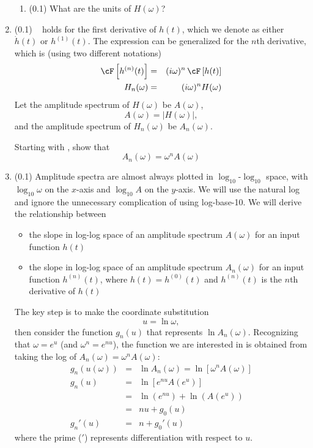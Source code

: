 \documentclass[11pt,titlepage,fleqn]{article}
\newcommand{\fft}{h}
\newcommand{\ffw}{H}
\begin{document}
\begin{enumerate}
\begin{enumerate}
\item (0.1) What are the units of $\ffw(\omega)$?
\end{enumerate}


\item (0.1) \ptag\  holds for the first derivative of $\fft(t)$, which we denote as either $\dot{\fft}(t)$ or $\fft^{(1)}(t)$. The expression can be generalized for the $n$th derivative, which is (using two different notations)
%
\begin{eqnarray}
\cF \left[ \fft^{(n)}(t) \right] &=& (i\omega)^n \, \cF \left[ \fft(t) \right]
\\
\ffw_n(\omega) &=& (i\omega)^n \ffw(\omega)
\label{fftnder}
\end{eqnarray}
%
Let the amplitude spectrum of $\ffw(\omega)$ be $A(\omega)$,
%
\begin{equation}
A(\omega) = |\ffw(\omega)|,
\end{equation}
%
and the amplitude spectrum of $\ffw_n(\omega)$ be $A_n(\omega)$.

Starting with , show that
%
\begin{equation}
A_n(\omega) = \omega^n A(\omega)
\end{equation}


\item (0.1) \ptag Amplitude spectra are almost always plotted in $\log_{10}$-$\log_{10}$ space, with $\log_{10}\omega$ on the $x$-axis and $\log_{10}A$ on the $y$-axis. We will use the natural log and ignore the unnecessary complication of using log-base-10. We will derive the relationship between
%
\begin{itemize}
\item the slope in log-log space of an amplitude spectrum $A(\omega)$ for an input function $\fft(t)$
\item the slope in log-log space of an amplitude spectrum $A_n(\omega)$ for an input function $h^{(n)}(t)$, where $h(t) = h^{(0)}(t)$ and $h^{(n)}(t)$ is the $n$th derivative of $h(t)$
\end{itemize}

The key step is to make the coordinate substitution
%
\begin{equation}
u = \ln\omega,
\end{equation}
%
then consider the function $g_n(u)$ that represents $\ln A_n(\omega)$. Recognizing that $\omega = e^u$ (and $\omega^n = e^{nu}$), the function we are interested in is obtained from taking the log of \mbox{$A_n(\omega) = \omega^n A(\omega)$}:
%
\begin{eqnarray}
g_n(u(\omega)) &=& \ln A_n(\omega) = \ln[ \omega^n A(\omega)]
\\
g_n(u) &=& \ln[ e^{nu} A(e^u) ]
\\
&=& \ln(e^{nu}) + \ln(A(e^u))
\\
&=& nu + g_0(u)
\\
g_n'(u) &=& n + g_0'(u)
\label{Anslope}
\end{eqnarray}
%
where the prime ($'$) represents differentiation with respect to $u$.


\end{enumerate}
\end{document}
